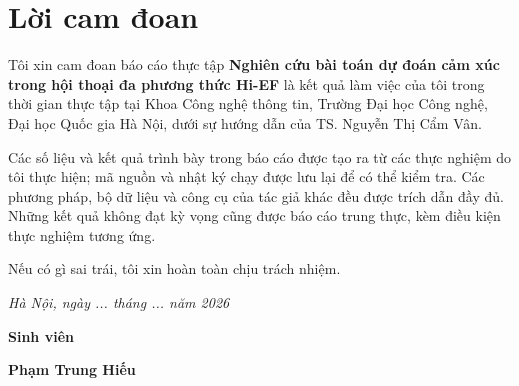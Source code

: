 \clearpage
{}
{}
\chapter*{Lời cam đoan}

Tôi xin cam đoan báo cáo thực tập \textbf{Nghiên cứu bài toán dự đoán cảm xúc trong hội thoại đa phương thức Hi-EF} là kết quả làm việc của tôi trong thời gian thực tập tại Khoa Công nghệ thông tin, Trường Đại học Công nghệ, Đại học Quốc gia Hà Nội, dưới sự hướng dẫn của TS. Nguyễn Thị Cẩm Vân.

Các số liệu và kết quả trình bày trong báo cáo được tạo ra từ các thực nghiệm do tôi thực hiện; mã nguồn và nhật ký chạy được lưu lại để có thể kiểm tra. Các phương pháp, bộ dữ liệu và công cụ của tác giả khác đều được trích dẫn đầy đủ. Những kết quả không đạt kỳ vọng cũng được báo cáo trung thực, kèm điều kiện thực nghiệm tương ứng.

Nếu có gì sai trái, tôi xin hoàn toàn chịu trách nhiệm.

\vspace{1cm}
\hspace{7cm}\textit{Hà Nội, ngày ... tháng ... năm 2026}

\hspace{9.4cm}\textbf{Sinh viên}
\vspace{2.5cm}

\hspace{8.8cm}\textbf{Phạm Trung Hiếu}
